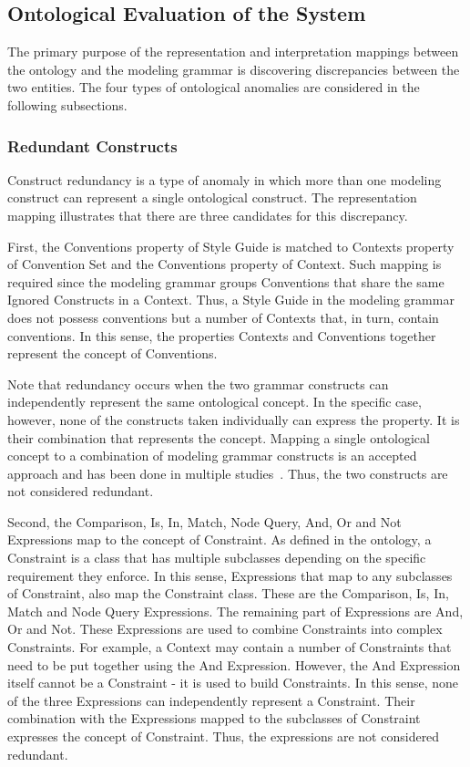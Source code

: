 \subsection{Ontological Evaluation of the System}

The primary purpose of the representation and interpretation mappings between
the ontology and the modeling grammar is discovering discrepancies between the
two entities. The four types of ontological anomalies are considered in the
following subsections.

\subsubsection{Redundant Constructs} 

Construct redundancy is a type of anomaly in which more than one modeling
construct can represent a single ontological construct. The representation
mapping illustrates that there are three candidates for this discrepancy.

First, the Conventions property of Style Guide is matched to Contexts property
of Convention Set and the Conventions property of Context. Such mapping is
required since the modeling grammar groups Conventions that share the same
Ignored Constructs in a Context. Thus, a Style Guide in the modeling grammar
does not possess conventions but a number of Contexts that, in turn, contain
conventions. In this sense, the properties Contexts and Conventions together
represent the concept of Conventions.

Note that redundancy occurs when the two grammar constructs can independently
represent the same ontological concept. In the specific case, however, none of
the constructs taken individually can express the property. It is their
combination that represents the concept. Mapping a single ontological concept
to a combination of modeling grammar constructs is an accepted approach and
has been done in multiple studies~\cite{gehlert2007toward}. Thus, the two
constructs are not considered redundant.

Second, the Comparison, Is, In, Match, Node Query, And, Or and Not Expressions
map to the concept of Constraint. As defined in the ontology, a Constraint is
a class that has multiple subclasses depending on the specific requirement
they enforce. In this sense, Expressions that map to any subclasses of
Constraint, also map the Constraint class. These are the Comparison, Is, In,
Match and Node Query Expressions. The remaining part of Expressions are And,
Or and Not. These Expressions are used to combine Constraints into complex
Constraints. For example, a Context may contain a number of Constraints that
need to be put together using the And Expression. However, the And Expression
itself cannot be a Constraint - it is used to build Constraints. In this
sense, none of the three Expressions can independently represent a Constraint.
Their combination with the Expressions mapped to the subclasses of Constraint
expresses the concept of Constraint. Thus, the expressions are not considered
redundant.

